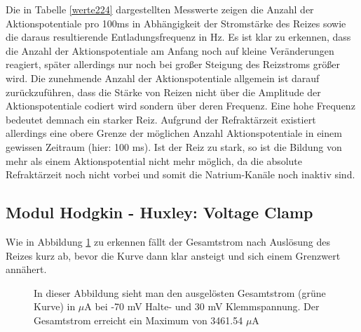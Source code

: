 \documentclass[11pt]{article}
\begin{document}
Die in Tabelle \ref{werte224} dargestellten Messwerte zeigen die Anzahl der Aktionspotentiale pro 100ms in Abhängigkeit der Stromstärke des Reizes sowie die daraus resultierende Entladungsfrequenz in Hz. Es ist klar zu erkennen, dass die Anzahl der Aktionspotentiale am Anfang noch auf kleine Veränderungen reagiert, später allerdings nur noch bei großer Steigung des Reizstroms größer wird. Die zunehmende Anzahl der Aktionspotentiale allgemein ist darauf zurückzuführen, dass die Stärke von Reizen nicht über die Amplitude der Aktionspotentiale codiert wird sondern über deren Frequenz. Eine hohe Frequenz bedeutet demnach ein starker Reiz. Aufgrund der Refraktärzeit existiert allerdings eine obere Grenze der möglichen Anzahl Aktionspotentiale in einem gewissen Zeitraum (hier: 100 ms).  Ist der Reiz zu stark, so ist die Bildung von mehr als einem Aktionspotential nicht mehr möglich, da die absolute Refraktärzeit noch nicht vorbei und somit die Natrium-Kanäle noch inaktiv sind.

\subsection{Modul Hodgkin - Huxley: Voltage Clamp}

Wie in Abbildung \ref{graph32} zu erkennen fällt der Gesamtstrom nach Auslösung des Reizes kurz ab, bevor die Kurve dann klar  ansteigt und sich einem Grenzwert annähert. 

\begin{figure}[H]
\caption{In dieser Abbildung sieht man den ausgelösten Gesamtstrom (grüne Kurve) in $\mu$A bei -70 mV Halte- und 30 mV Klemmspannung. Der Gesamtstrom erreicht ein Maximum von 3461.54 $\mu$A}
\label{graph32}
\end{figure}
\end{document}
